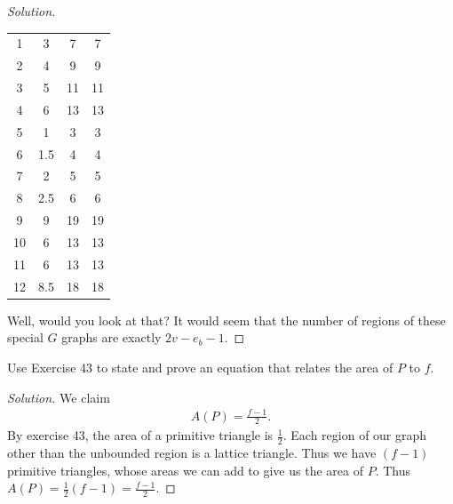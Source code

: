 \documentclass[12pt]{article}
\newenvironment{exercise}[2][Exercise]{\begin{trivlist}
        \item[\hskip \labelsep {\bfseries #1}\hskip \labelsep {\bfseries #2.}]}{\end{trivlist}}
\newenvironment{solution}
        {\begin{proof}[Solution]}
                    {\end{proof}}
\begin{document}
\begin{exercise}{57}
\begin{solution}
\begin{center}
\begin{tabular}{| c | c | c | c |}
                \hline
                \hline
                1 & 3 & 7 & 7\\
                2 & 4 & 9 & 9\\
                3 & 5 & 11 & 11\\
                4 & 6 & 13 & 13\\
                5 & 1 & 3 & 3\\
                6 & 1.5 & 4 & 4\\
                7 & 2 & 5 & 5\\
                8 & 2.5 & 6 & 6\\
                9 & 9 & 19 & 19\\
                10 & 6 & 13 & 13\\
                11 & 6 & 13 & 13\\
                12 & 8.5 & 18 & 18\\
                \hline
            \end{tabular}
        \end{center}
        Well, would you look at that? It would seem that the number of regions of these special \( G \) graphs are exactly \( 2v-e_{b} -1. \)
    \end{solution}
\end{exercise}

\begin{exercise}{58}
    Use Exercise 43 to state and prove an equation that relates the area of \( P \) to \( f . \)
    \begin{solution}
        We claim
        \begin{align*}
            A(P) = \frac{f-1}{2} .
        \end{align*}
        By exercise 43, the area of a primitive triangle is \( \frac{1}{2} . \) Each region of our graph other than the unbounded region is a lattice triangle. Thus we have \( (f-1) \) primitive triangles, whose areas we can add to give us the area of \( P. \) Thus \( A(P) = \frac{1}{2} (f-1) = \frac{f-1}{2} . \)
    \end{solution}
\end{exercise}
\end{document}
